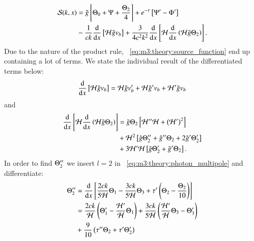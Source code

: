     \begin{equation}\label{eq:m3:theory:source_function}
        \begin{split}
            \mathcal{S}(k,x) &= \tilde{g}\left[\Theta_0+\Psi+\frac{\Theta_2}{4}\right] + e^{-\tau}\left[\Psi'-\Phi'\right]\\
            &-\frac{1}{ck}\dv{}{x}\left[\mathcal{H}\tilde{g}v_b\right] + \frac{3}{4c^2k^2}\dv{}{x}\left[\mathcal{H}\dv{}{x}\left(\mathcal{H}\tilde{g}\Theta_2\right)\right].
        \end{split}
    \end{equation}
    Due to the nature of the product rule, ~\cref{eq:m3:theory:source_function} end up containing a lot of terms. We state the individual result of the differentiated terms below:
    \begin{equation}\label{eq:m3:theory:dvHgv_b}
        \dv{}{x}\left[\mathcal{H}\tilde{g}v_b\right] = \mathcal{H}\tilde{g}v_b' + \mathcal{H}\tilde{g}'v_b + \mathcal{H}'\tilde{g}v_b
    \end{equation}
    and
    \begin{equation}\label{eq:m3:theory:dvHdvHgT}
        \begin{split}
            \dv{}{x}\left[\mathcal{H}\dv{}{x}\left(\mathcal{H}\tilde{g}\Theta_2\right)\right] &= \tilde{g}\Theta_2\left[\mathcal{H}''\mathcal{H} + \left(\mathcal{H}'\right)^2\right] \\
            &+\mathcal{H}^2\left[\tilde{g}\Theta_2'' + \tilde{g}''\Theta_2 + 2\tilde{g}'\Theta_2'\right] \\
            &+3\mathcal{H}'\mathcal{H}\left[\tilde{g}\Theta_2'+\tilde{g}'\Theta_2\right].
        \end{split}
    \end{equation}
    In order to find $\Theta_2''$ we insert $l=2$ in ~\cref{eq:m3:theory:photon_multipole} and differentiate:
    \begin{equation}\label{eq:m3:theory:dipole_double_deriv}
        \begin{split}
            \Theta_2'' &= \dv{}{x}\left[\frac{2ck}{5\mathcal{H}}\Theta_1-\frac{3ck}{5\mathcal{H}}\Theta_3 + \tau'\left(\Theta_2-\frac{\Theta_2}{10}\right)\right] \\
            &= \frac{2ck}{\mathcal{H}}\left(\Theta_1'-\frac{\mathcal{H}'}{\mathcal{H}}\Theta_1\right) + \frac{3ck}{5\mathcal{H}}\left(\frac{\mathcal{H}'}{\mathcal{H}}\Theta_3 - \Theta_3'\right)\\
            &+ \frac{9}{10}\left(\tau''\Theta_2 + \tau'\Theta_2'\right)
        \end{split}
    \end{equation}



